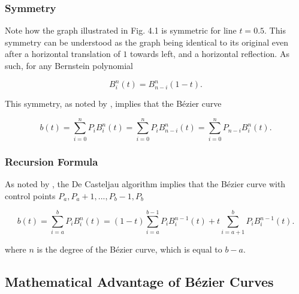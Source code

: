 \documentclass[12pt, oneside]{article}   	%
\numberwithin{figure}{section}
\begin{document}
\subsubsection{Symmetry}
Note how the graph illustrated in Fig. 4.1 is symmetric for line \(t=0.5\). This symmetry can be understood as the graph being identical to its original even after a horizontal translation of \(1\) towards left, and a horizontal reflection. As such, for any Bernstein polynomial

\begin{equation}
B_{i}^{n}(t) = B_{n-i}^{n}(1-t).
\end{equation}

This symmetry, as noted by , implies that the B\'{e}zier curve

\begin{equation}
b(t) = \displaystyle\sum_{i=0}^{n}P_i B_{i}^{n}(t) = \displaystyle\sum_{i=0}^{n}P_i B_{n-i}^{n}(t) = \displaystyle\sum_{i=0}^{n}P_{n-i} B_{i}^{n}(t).
\end{equation}

\subsubsection{Recursion Formula}

As noted by , the De Casteljau algorithm implies that the B\'{e}zier curve with control points \(P_a, P_a+1, ... , P_b-1, P_b\)

\begin{equation}
b(t) = \displaystyle\sum_{i=a}^{b}P_i B_{i}^{n}(t) = (1-t)\displaystyle\sum_{i=a}^{b-1}P_i B_{i}^{n-1}(t) + t\displaystyle\sum_{i=a+1}^{b}P_i B_{i}^{n-1}(t).
\end{equation}

where \(n\) is the degree of the B\'{e}zier curve, which is equal to \(b-a\).

\subsection{Mathematical Advantage of B\'{e}zier Curves}

%

\newpage




\cite{BUBBA:2015}
\end{document}
